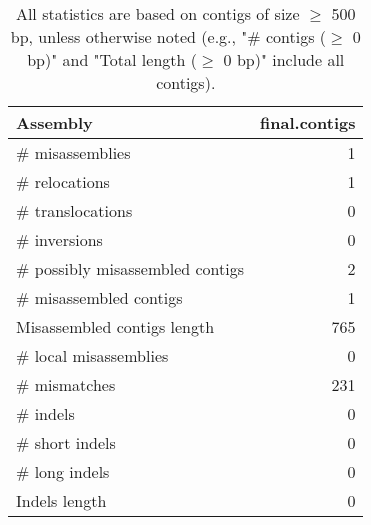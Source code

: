 \documentclass[12pt,a4paper]{article}
\begin{document}
\begin{table}[ht]
\begin{center}
\caption{All statistics are based on contigs of size $\geq$ 500 bp, unless otherwise noted (e.g., "\# contigs ($\geq$ 0 bp)" and "Total length ($\geq$ 0 bp)" include all contigs).}
\begin{tabular}{|l*{1}{|r}|}
\hline
Assembly & final.contigs \\ \hline
\# misassemblies & 1 \\ \hline
\hspace{5mm}\# relocations & 1 \\ \hline
\hspace{5mm}\# translocations & 0 \\ \hline
\hspace{5mm}\# inversions & 0 \\ \hline
\# possibly misassembled contigs & 2 \\ \hline
\# misassembled contigs & 1 \\ \hline
Misassembled contigs length & 765 \\ \hline
\# local misassemblies & 0 \\ \hline
\# mismatches & 231 \\ \hline
\# indels & 0 \\ \hline
\hspace{5mm}\# short indels & 0 \\ \hline
\hspace{5mm}\# long indels & 0 \\ \hline
Indels length & 0 \\ \hline
\end{tabular}
\end{center}
\end{table}
\end{document}
